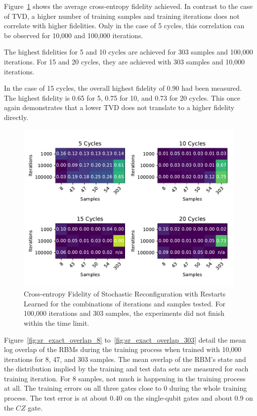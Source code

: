 Figure~\ref{fig:am_fxeb} shows the average cross-entropy fidelity achieved. In contrast to the case 
of TVD, a higher number of training samples and training iterations does not correlate with higher 
fidelities. Only in the case of 5 cycles, this correlation can be observed for 10,000 and 100,000 iterations.

The highest fidelities for 5 and 10 cycles are achieved for 303 samples and 100,000 iterations. For 
15 and 20 cycles, they are achieved with 303 samples and 10,000 iterations. 

In the case of 15 cycles, the overall highest fidelity of 0.90 had been measured. The highest fidelity is 0.65 for 5, 0.75 for 10, and 0.73 for 20 cycles.
This once again demonstrates that a lower TVD does not translate to a higher fidelity directly.

\begin{figure}[H]
  \centering
  \includegraphics[width=\textwidth]{figures/results/AM-restarts-learned/fxeb_heatmap.pdf}
  \caption[Cross-entropy Fidelity of AdaMax with Restarts Learned]{Cross-entropy Fidelity of Stochastic 
  Reconfiguration with Restarts Learned for the combinations of iterations and samples tested.
  For 100,000 iterations and 303 samples, the experiments did not finish within the time limit.}
  \label{fig:am_fxeb}
\end{figure}

Figure~\ref{fig:sr_exact_overlap_8} to~\ref{fig:sr_exact_overlap_303} detail the mean log overlap of the RBMs during the 
training process when trained with 10,000 iterations for 8, 47, and 303 samples. The 
mean overlap of the RBM's state and the distribution implied by the training and test data sets are measured 
for each training iteration.
For 8 samples, not much is happening in the training process at all. The training errors on all three gates
close to 0 during the whole training process. The test error is at about 0.40 on the single-qubit gates and about 
0.9 on the $CZ$ gate.

